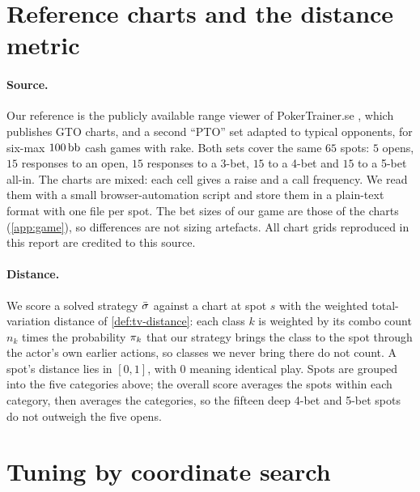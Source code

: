 \section{Reference charts and the distance metric}\label{sec:reference}

\paragraph{Source.} Our reference is the publicly available range viewer of PokerTrainer.se \cite{pokertrainer}, which publishes GTO charts, and a second \enquote{PTO} set adapted to typical opponents, for six-max $100\,\mathrm{bb}$ cash games with rake. Both sets cover the same $65$ spots: $5$ opens, $15$ responses to an open, $15$ responses to a 3-bet, $15$ to a 4-bet and $15$ to a 5-bet all-in. The charts are mixed: each cell gives a raise and a call frequency. We read them with a small browser-automation script and store them in a plain-text format with one file per spot. The bet sizes of our game are those of the charts (\cref{app:game}), so differences are not sizing artefacts. All chart grids reproduced in this report are credited to this source.

\paragraph{Distance.} We score a solved strategy $\bar\sigma$ against a chart at spot $s$ with the weighted total-variation distance of \cref{def:tv-distance}: each class $k$ is weighted by its combo count $n_k$ times the probability $\pi_k$ that our strategy brings the class to the spot through the actor's own earlier actions, so classes we never bring there do not count. A spot's distance lies in $[0,1]$, with $0$ meaning identical play. Spots are grouped into the five categories above; the overall score averages the spots within each category, then averages the categories, so the fifteen deep 4-bet and 5-bet spots do not outweigh the five opens.

\section{Tuning by coordinate search}\label{sec:tuning}

